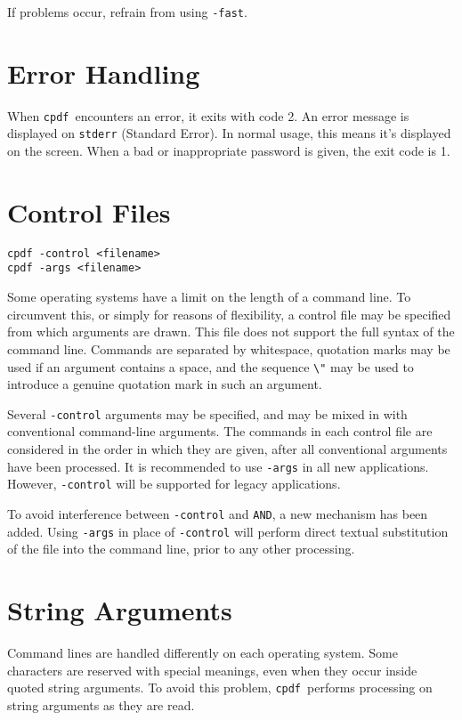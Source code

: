\documentclass{book}
\newcommand{\cpdf}{\texttt{cpdf}}
\begin{document}
\noindent If problems occur, refrain from using \verb!-fast!.

\section{Error Handling}
When \cpdf\ encounters an error, it exits with code 2. An error message is
displayed on \texttt{stderr} (Standard Error). In normal usage, this means it's
displayed on the screen. When a bad or inappropriate password is given, the exit code is 1.

\section{Control Files}
\begin{framed}
  \noindent\small\verb!cpdf -control <filename>!\\
  \noindent\small\verb!cpdf -args <filename>!
\end{framed}

Some operating systems have a limit on the length of a command line. To
circumvent this, or simply for reasons of flexibility, a control file may be
specified from which arguments are drawn. This file does not support the full
syntax of the command line. Commands are separated by whitespace, quotation
marks may be used if an argument contains a space, and the sequence \verb!\"!
may be used to introduce a genuine quotation mark in such an argument.

Several \verb!-control! arguments may be specified, and may be mixed in with
conventional command-line arguments. The commands in each control file are
considered in the order in which they are given, after all conventional
arguments have been processed. It is recommended to use \texttt{-args} in all new applications. However, \texttt{-control} will be supported for legacy applications.

To avoid interference between \texttt{-control} and \texttt{AND}, a new mechanism has been added. Using \texttt{-args} in place of \texttt{-control} will perform direct textual substitution of the file into the command line, prior to any other processing.


\section{String Arguments}
Command lines are handled differently on each operating system. Some
characters are reserved with special meanings, even when they occur inside
quoted string arguments. To avoid this problem, \cpdf\ performs processing on
string arguments as they are read.
\end{document}
